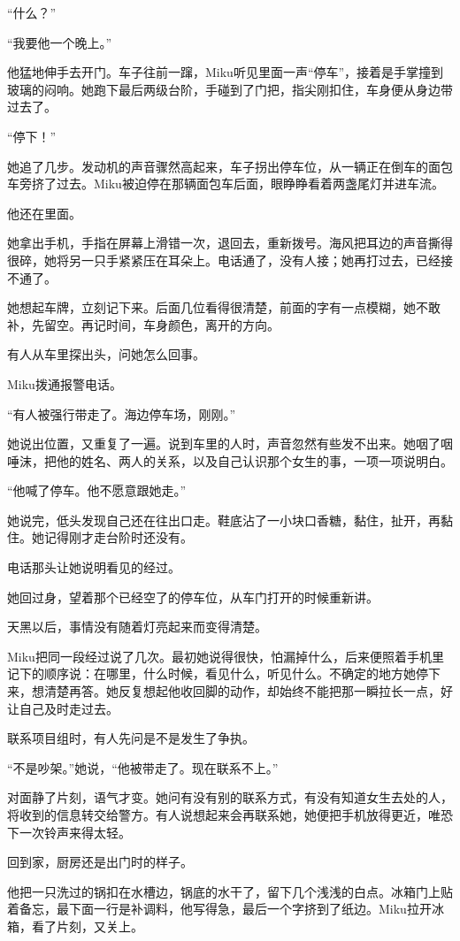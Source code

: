 “什么？”

“我要他一个晚上。”

他猛地伸手去开门。车子往前一蹿，Miku听见里面一声“停车”，接着是手掌撞到玻璃的闷响。她跑下最后两级台阶，手碰到了门把，指尖刚扣住，车身便从身边带过去了。

“停下！”

她追了几步。发动机的声音骤然高起来，车子拐出停车位，从一辆正在倒车的面包车旁挤了过去。Miku被迫停在那辆面包车后面，眼睁睁看着两盏尾灯并进车流。

他还在里面。

她拿出手机，手指在屏幕上滑错一次，退回去，重新拨号。海风把耳边的声音撕得很碎，她将另一只手紧紧压在耳朵上。电话通了，没有人接；她再打过去，已经接不通了。

她想起车牌，立刻记下来。后面几位看得很清楚，前面的字有一点模糊，她不敢补，先留空。再记时间，车身颜色，离开的方向。

有人从车里探出头，问她怎么回事。

Miku拨通报警电话。

“有人被强行带走了。海边停车场，刚刚。”

她说出位置，又重复了一遍。说到车里的人时，声音忽然有些发不出来。她咽了咽唾沫，把他的姓名、两人的关系，以及自己认识那个女生的事，一项一项说明白。

“他喊了停车。他不愿意跟她走。”

她说完，低头发现自己还在往出口走。鞋底沾了一小块口香糖，黏住，扯开，再黏住。她记得刚才走台阶时还没有。

电话那头让她说明看见的经过。

她回过身，望着那个已经空了的停车位，从车门打开的时候重新讲。

\SceneBreak

天黑以后，事情没有随着灯亮起来而变得清楚。

Miku把同一段经过说了几次。最初她说得很快，怕漏掉什么，后来便照着手机里记下的顺序说：在哪里，什么时候，看见什么，听见什么。不确定的地方她停下来，想清楚再答。她反复想起他收回脚的动作，却始终不能把那一瞬拉长一点，好让自己及时走过去。

联系项目组时，有人先问是不是发生了争执。

“不是吵架。”她说，“他被带走了。现在联系不上。”

对面静了片刻，语气才变。她问有没有别的联系方式，有没有知道女生去处的人，将收到的信息转交给警方。有人说想起来会再联系她，她便把手机放得更近，唯恐下一次铃声来得太轻。

回到家，厨房还是出门时的样子。

他把一只洗过的锅扣在水槽边，锅底的水干了，留下几个浅浅的白点。冰箱门上贴着备忘，最下面一行是补调料，他写得急，最后一个字挤到了纸边。Miku拉开冰箱，看了片刻，又关上。


